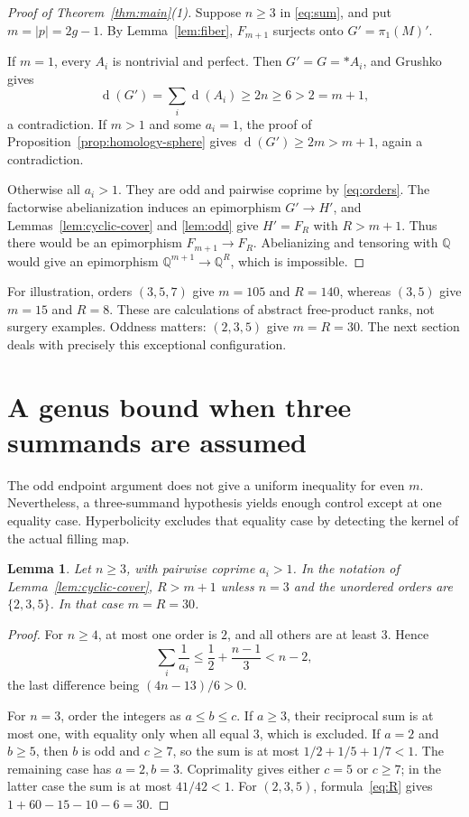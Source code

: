 \documentclass[11pt]{article}
\newtheorem{lemma}[theorem]{Lemma}
\theoremstyle{remark}
\newcommand{\Q}{\mathbb Q}
\newcommand{\gen}{\operatorname{d}}
\begin{document}
\begin{proof}[Proof of Theorem~\ref{thm:main}(1)]
Suppose $n\geq3$ in \eqref{eq:sum}, and put $m=|p|=2g-1$. By Lemma~\ref{lem:fiber}, $F_{m+1}$ surjects onto $G'=\pi_1(M)'$.

If $m=1$, every $A_i$ is nontrivial and perfect. Then $G'=G=*A_i$, and Grushko gives
\[
 \gen(G')=\sum_i\gen(A_i)\geq2n\geq6>2=m+1,
\]
a contradiction. If $m>1$ and some $a_i=1$, the proof of Proposition~\ref{prop:homology-sphere} gives $\gen(G')\geq2m>m+1$, again a contradiction.

Otherwise all $a_i>1$. They are odd and pairwise coprime by \eqref{eq:orders}. The factorwise abelianization induces an epimorphism $G'\to H'$, and Lemmas~\ref{lem:cyclic-cover} and \ref{lem:odd} give $H'=F_R$ with $R>m+1$. Thus there would be an epimorphism $F_{m+1}\to F_R$. Abelianizing and tensoring with $\Q$ would give an epimorphism $\Q^{m+1}\to\Q^R$, which is impossible.
\end{proof}

For illustration, orders $(3,5,7)$ give $m=105$ and $R=140$, whereas $(3,5)$ give $m=15$ and $R=8$. These are calculations of abstract free-product ranks, not surgery examples. Oddness matters: $(2,3,5)$ give $m=R=30$. The next section deals with precisely this exceptional configuration.

\section{A genus bound when three summands are assumed}\label{sec:genus}

The odd endpoint argument does not give a uniform inequality for even $m$. Nevertheless, a three-summand hypothesis yields enough control except at one equality case. Hyperbolicity excludes that equality case by detecting the kernel of the actual filling map.

\begin{lemma}\label{lem:recip}
Let $n\geq3$, with pairwise coprime $a_i>1$. In the notation of Lemma~\ref{lem:cyclic-cover}, $R>m+1$ unless $n=3$ and the unordered orders are $\{2,3,5\}$. In that case $m=R=30$.
\end{lemma}
\begin{proof}
For $n\geq4$, at most one order is $2$, and all others are at least $3$. Hence
\[
 \sum_i\frac1{a_i}\leq\frac12+\frac{n-1}{3}<n-2,
\]
the last difference being $(4n-13)/6>0$.

For $n=3$, order the integers as $a\leq b\leq c$. If $a\geq3$, their reciprocal sum is at most one, with equality only when all equal $3$, which is excluded. If $a=2$ and $b\geq5$, then $b$ is odd and $c\geq7$, so the sum is at most $1/2+1/5+1/7<1$. The remaining case has $a=2,b=3$. Coprimality gives either $c=5$ or $c\geq7$; in the latter case the sum is at most $41/42<1$. For $(2,3,5)$, formula~\eqref{eq:R} gives $1+60-15-10-6=30$.
\end{proof}
\end{document}
